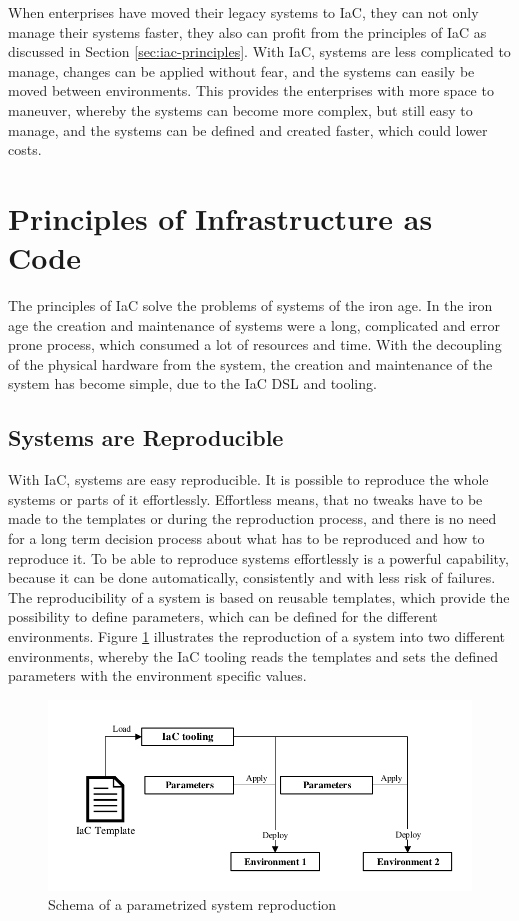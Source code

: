 When enterprises have moved their legacy systems to IaC, they can not only manage their systems faster, they also can profit from the principles of IaC as discussed in Section \vref{sec:iac-principles}. With IaC, systems are less complicated to manage, changes can be applied without fear, and the systems can easily be moved between environments. This provides the enterprises with more space to maneuver, whereby the systems can become more complex, but still easy to manage, and the systems can be defined and created faster, which could lower costs.    

\section{Principles of Infrastructure as Code}
\label{sec:iac-principles}
The principles of IaC solve the problems of systems of the iron age. In the iron age the creation and maintenance of systems were a long, complicated and error prone process, which consumed a lot of resources and time. With the decoupling of the physical hardware from the system, the creation and maintenance of the system has become simple, due to the IaC DSL and tooling. 

\subsection{Systems are Reproducible}
\label{sec:iac-principles-reproducibility}
With IaC, systems are easy reproducible. It is possible to reproduce the whole systems or parts of it effortlessly. Effortless means, that no tweaks have to be made to the templates or during the reproduction process, and there is no need for a long term decision process about what has to be reproduced and how to reproduce it. To be able to reproduce systems effortlessly is a powerful capability, because it can be done automatically, consistently and with less risk of failures. The reproducibility of a system is based on reusable templates, which provide the possibility to define parameters, which can be defined for the different environments. Figure \ref{fig:reproduce-infrastructure} illustrates the reproduction of a system into two different environments, whereby the IaC tooling reads the templates and sets the defined parameters with the environment specific values\cite{Morris2016}.

\begin{figure}[htbp]
	\centering
	\includegraphics[scale=1]{images/reproduce-infrastructure.pdf}
	\caption{Schema of a parametrized system reproduction}
	\label{fig:reproduce-infrastructure}
\end{figure} 

